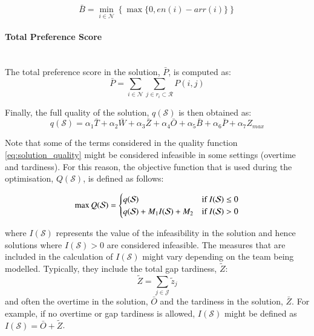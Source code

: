 \documentclass[a4paper,11pt]{elsarticle}
\begin{document}
\begin{equation}
    \bar{B} = \min_{i \in \mathcal{N}} \left\{\max \{0, en(i) - arr(i)\} \right\}
\end{equation}

\paragraph{Total Preference Score}\ \\

The total preference score in the solution, $\bar{P}$, is computed as:
\begin{equation}
    \bar{P} = \sum_{i \in \mathcal{N}} \sum_{j \in r_i \subset \mathcal{R}} P(i,j)
\end{equation}




Finally, the full quality of the solution, $q(\mathcal{S})$ is then obtained as:
\begin{equation}\label{eq:solution_quality}
    q(\mathcal{S}) = \alpha_1 \bar{T} + %
         \alpha_2 \bar{W} + %
         \alpha_3 \bar{Z} + %
         \alpha_4 \bar{O} + %
         \alpha_5 \bar{B} + %
         \alpha_6 \bar{P} + %
         \alpha_7 Z_{max} 
\end{equation}

Note that some of the terms considered in the quality function \eqref{eq:solution_quality} might be considered infeasible in some settings (\eg overtime and tardiness). For this reason, the objective function that is used during the optimisation, $Q(\mathcal{S})$, is defined as follows:

\begin{equation}\label{eq:real_obj_function}
  \max Q(\mathcal{S}) =
  \begin{cases}
   q(\ensuremath{\mathcal{S}}) & \text{if \ensuremath{I(\mathcal{S}) \leq 0}} \\
   q(\ensuremath{\mathcal{S}}) + \ensuremath{M_1 I(\mathcal{S})} + \ensuremath{M_2} & \text{if \ensuremath{I(\mathcal{S}) > 0}} \\
  \end{cases}
\end{equation}

where $I(\mathcal{S})$ represents the value of the infeasibility in the solution and hence solutions where $I(\mathcal{S}) > 0$ are considered infeasible. The measures that are included in the calculation of $I(\mathcal{S})$ might vary depending on the team being modelled. Typically, they include the total gap tardiness, $\tilde{Z}$:
\begin{equation}
    \tilde{Z} = \sum_{j \in \mathcal{J}} \tilde{z}_j
\end{equation}
 and often the overtime in the solution, $\bar{O}$ and the tardiness in the solution, $\bar{Z}$. For example, if no overtime or gap tardiness is allowed, $I(\mathcal{S})$ might be defined as $I(\mathcal{S}) = \bar{O} + \tilde{Z}$.
\end{document}
